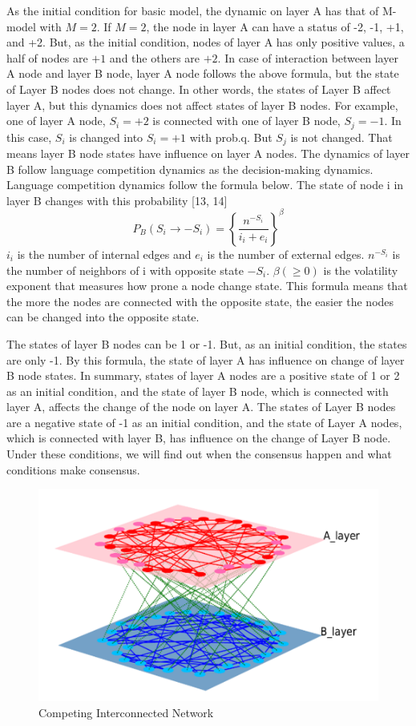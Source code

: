 \documentclass[english]{cccconf}
\begin{document}
As the initial condition for basic model, the dynamic on layer A has that of M-model with $M = 2$. If $M = 2$, the node in layer A can have a status of -2, -1, +1, and +2. But, as the initial condition, nodes of layer A has only positive values, a half of nodes are $+1$ and the others are $+2$. In case of interaction between layer A node and layer B node, layer A node follows the above formula, but the state of Layer B nodes does not change. In other words, the states of Layer B affect layer A, but this dynamics does not affect states of layer B nodes. For example, one of layer A node, $S_i = +2$ is connected with one of layer B node, $S_j = -1$. In this case, $S_i$ is changed into $S_i = +1$ with prob.q. But $S_j$ is not changed. That means layer B node states have influence on layer A nodes. 
The dynamics of layer B follow language competition dynamics as the decision-making dynamics. Language competition dynamics follow the formula below. The state of node i in layer B changes with this probability [13, 14] 
\begin{equation}
P_B(S_i \rightarrow -S_i)= \left \{\frac{n^{-S_i}}{i_i + e_i}\right \}^\beta
\end{equation}
$i_i$ is the number of internal edges and $e_i$ is the number of external edges. $n^{-S_i}$ is the number of neighbors of i with opposite state $-S_i$. $\beta(\geq 0)$ is the volatility exponent that measures how prone a node change state. This formula means that the more the nodes are connected with the opposite state, the easier the nodes can be changed into the opposite state.  

The states of layer B nodes can be 1 or -1. But, as an initial 
condition, the states are only -1. By this formula, the state of layer A has influence on change of layer B node states.
In summary, states of layer A nodes are a positive state of 1 or 2 as an initial condition, and the state of layer B node, which is connected with layer A, affects the change of the node on layer A. The states of Layer B nodes are a negative state of -1 as an initial condition, and the state of Layer A nodes, which is connected with layer B, has influence on the change of Layer B node. Under these conditions, we will find out when the consensus happen and what conditions make consensus.
\begin{figure}[!htb]
  \centering
  \includegraphics[width=\hsize]{FIG1.png}
  \caption{Competing Interconnected Network}
  \label{Fig1}
\end{figure}
\end{document}
